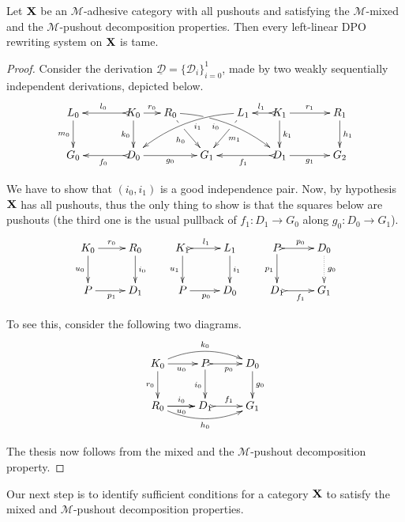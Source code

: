 \documentclass[a4paper,UKenglish,cleveref,pdftex, thm-restate,numberwithinsect]{lipics}
\def\X{\textbf {\textup{X}}}
\newcommand{\dder}[1]{\mathscr{#1}}
\newcommand{\der}[1]{\underline{\dder{#1}}}
\begin{document}
\begin{theorem}\label{thm:good1}Let $\X$ be an $\mathcal{M}$-adhesive category with all pushouts and satisfying the $\mathcal{M}$-mixed and the $\mathcal{M}$-pushout decomposition properties. Then every left-linear DPO rewriting system on $\X$ is tame.
\end{theorem}
\begin{proof} 
	Consider the derivation $\der{D}=\{\dder{D}_i\}_{i=0}^1$, made by two weakly sequentially independent derivations, depicted below.
	\[\xymatrix@C=15pt{L_0 \ar[d]_{m_0}&& K_0 \ar[d]_{k_0}\ar@{>->}[ll]_{l_0} \ar[r]^{r_0} & R_0 \ar@/^.35cm/[drrr]|(.3)\hole_(.4){i_0} \ar[dr]|(.3)\hole_{h_0} && L_1 \ar@/_.35cm/[dlll]^(.4){i_1} \ar[dl]|(.3)\hole^{m_1}& K_1 \ar[d]^{k_1}\ar@{>->}[l]_{l_1} \ar[rr]^{r_1} && R_1 \ar[d]^{h_1} \\G_0 && \ar@{>->}[ll]^{f_0} D_0 \ar[rr]_{g_0}&& G_1  && \ar@{>->}[ll]^{f_1} D_1 \ar[rr]_{g_1}&& G_2 }\]

We have to show that $(i_0, i_1)$ is a good independence pair. Now, by hypothesis $\X$ has all pushouts, thus the only thing to show is that the squares below are pushouts (the third one is the usual pullback of $f_1\colon D_1\to G_0$ along $g_0\colon D_0\to G_1$).
			\[\xymatrix{K_0 \ar[r]^{r_0}  \ar[d]_{u_0}& R_0 \ar[d]^{i_0} & K_1 \ar@{>->}[r]^{l_1}  \ar[d]_{u_1}& L_1 \ar[d]^{i_1}&P \ar@{>->}[r]^{p_0} \ar[d]_{p_1}& D_0\ar@{.>}[d]^{g_0} \\ P \ar[r]_{p_1} & D_1 &P \ar[r]_{p_0}  & D_0&D_1 \ar@{>->}[r]_{f_1} & G_1}\]

To see this, consider the following two diagrams.
\[\xymatrix{K_0 \ar@/^.4cm/[rr]^{k_0} \ar[d]_{r_0} \ar[r]_{u_0}& \ar@{>->}[r]_{p_0} P \ar[d]_{i_0}& D_0 \ar[d]^{g_0}\\ R_0 \ar@/_.4cm/[rr]_{h_0}  \ar[r]_{u_0}\ar[r]^{i_0}& D_1 \ar@{>->}[r]^{f_1}& G_1}\]

The thesis now follows from the mixed and the $\mathcal{M}$-pushout decomposition property.
\end{proof}

Our next step is to identify sufficient conditions for a category $\X$ to satisfy the mixed and $\mathcal{M}$-pushout decomposition properties.

\begin{definition}
\end{definition}

\begin{example}
\end{example}
\end{document}
